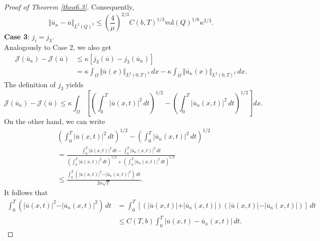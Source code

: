 \documentclass[reqno]{amsart}
\begin{document}
\begin{proof}[Proof of Theorem \ref{theo6.3}]
		Consequently,
		\begin{equation} \label{sta_j2}
			\Vert \overline{u}_{\kappa} - \overline{u} \Vert_{L^2(Q)^3} \leq \left(\frac{4}{\mu}\right)^{2/3}C(b,T)^{1/3} \text{vol}(Q)^{1/6} \kappa^{2/3}.
		\end{equation}
		\textbf{Case 3}: $j_i=j_3$.\\
		Analogously to Case 2, we also get
		\begin{equation} \label{6.3.6}
			\begin{aligned}
				\mathcal{J}({\overline{u}}_{\kappa}) - \mathcal{J}(\overline{u}) &\leq \kappa \left[ j_3(\overline{u}) - j_3 (\overline{u}_{\kappa}) \right] \\
				&= \kappa\int_\Omega \Vert \overline{u}(x) \Vert_{L^2(0,T)^3}\, dx - \kappa \int_\Omega \Vert \overline{u}_{\kappa} (x)\Vert_{L^2(0,T)^3} \, dx.
			\end{aligned}
		\end{equation}
		The definition of $j_3$ yields
		\begin{equation*}
			\mathcal{J}({\overline{u}}_{\kappa}) - \mathcal{J}(\overline{u}) \leq \kappa \int_\Omega\left[ \left( \int_0^T \vert \overline{u}(x,t) \vert^2 \, dt\right)^{1/2} - \left( \int_0^T \vert \overline{u}_{\kappa}(x,t) \vert^2 \, dt\right)^{1/2} \right]dx.
		\end{equation*}
		On the other hand, we can write
		\begin{align*} 
			&\left( \int_0^T \vert \overline{u}(x,t) \vert^2 \, dt\right)^{1/2} - \left( \int_0^T \vert \overline{u}_{\kappa}(x,t) \vert^2 \, dt\right)^{1/2} \\&= \displaystyle \frac{\int_0^T \vert \overline{u}(x,t) \vert^2 \, dt - \int_0^T \vert \overline{u}_{\kappa}(x,t) \vert^2 \, dt }{\left( \int_0^T \vert \overline{u}(x,t) \vert^2 \, dt\right)^{1/2} + \left( \int_0^T \vert \overline{u}_{\kappa}(x,t) \vert^2 \, dt\right)^{1/2}} \\
			&\leq \frac{\int_0^T (\vert \overline{u}(x,t) \vert^2 - \vert\overline{u}_{\kappa}(x,t)\vert^2) \, dt}{2a\sqrt{T}}.
		\end{align*}
		It follows that
		\begin{align*}
			\int_0^T \left( \vert \overline{u}(x,t) \vert^2 - \vert\overline{u}_{\kappa}(x,t)\vert^2 \right) \, dt &= \int_0^T \left[ (\vert \overline{u}(x,t)\vert+\vert \overline{u}_{\kappa}(x,t)\vert)(\vert \overline{u}(x,t)\vert-\vert \overline{u}_{\kappa}(x,t)\vert) \right] \, dt \\
			&\leq C(T,b)\int_0^T \vert \overline{u}(x,t) - \overline{u}_{\kappa}(x,t) \vert \, dt.

\end{align*}
\end{proof}
\end{document}
